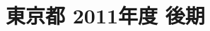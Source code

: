 \documentclass[../../hsm_tok_q.tex]{subfiles}
\begin{document}
    \section{東京都 2011年度 後期}
    \subsection{　}
    
    \newpage
    \subsection{　}
    
    \newpage
    \subsection{　}
    
    \newpage
    \subsection{　}
    
    \newpage
    \subsection{　}
    
\end{document}
